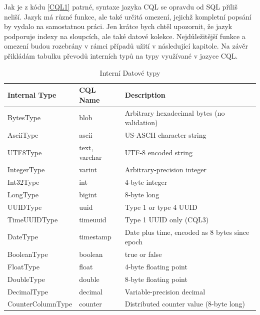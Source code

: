 Jak je z kódu \ref{CQL1} patrné, syntaxe jazyka CQL se opravdu od SQL příliš neliší. Jazyk má různé funkce, ale také určitá omezení, jejichž kompletní popsání by vydalo na samostatnou práci. Jen krátce bych chtěl upozornit, že jazyk podporuje indexy na sloupcích, ale také datové kolekce. Nejdůležitější funkce a omezení budou rozebrány v rámci případů užití v následující kapitole. Na závěr přikládám tabulku převodů interních typů na typy využívané v jazyce CQL.

\begin{table}[h]

    \begin{tabular}{|l|l|l|}
    \hline
    Internal Type     & CQL Name      & Description                                    \\ \hline
    BytesType         & blob          & Arbitrary hexadecimal bytes (no validation)    \\ \hline
    AsciiType         & ascii         & US-ASCII character string                      \\ \hline
    UTF8Type          & text, varchar & UTF-8 encoded string                           \\ \hline
    IntegerType       & varint        & Arbitrary-precision integer                    \\ \hline
    Int32Type         & int           & 4-byte integer                                 \\ \hline
    LongType          & bigint        & 8-byte long                                    \\ \hline
    UUIDType          & uuid          & Type 1 or type 4 UUID                          \\ \hline
    TimeUUIDType      & timeuuid      & Type 1 UUID only (CQL3)                        \\ \hline
    DateType          & timestamp     & Date plus time, encoded as 8 bytes since epoch \\ \hline
    BooleanType       & boolean       & true or false                                  \\ \hline
    FloatType         & float         & 4-byte floating point                          \\ \hline
    DoubleType        & double        & 8-byte floating point                          \\ \hline
    DecimalType       & decimal       & Variable-precision decimal                     \\ \hline
    CounterColumnType & counter       & Distributed counter value (8-byte long)        \\ \hline
    \end{tabular}
    \caption {Interní Datové typy}
   \label{datatypes}
\end{table}